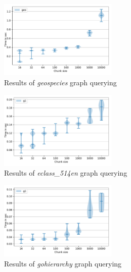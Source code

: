 \begin{figure}[h]
\centering
\includegraphics[width=0.5\textwidth]{data/raw_redis/geospecies.pdf}
\caption{Results of \textit{geospecies} graph querying}
\end{figure}

\begin{figure}[h]
\centering
\includegraphics[width=0.5\textwidth]{data/raw_redis/eclass_514en.pdf}
\caption{Results of \textit{eclass\_514en} graph querying}
\end{figure}

\begin{figure}[h]
\centering
\includegraphics[width=0.5\textwidth]{data/raw_redis/gohierarchy.pdf}
\caption{Results of \textit{gohierarchy} graph querying}
\end{figure}